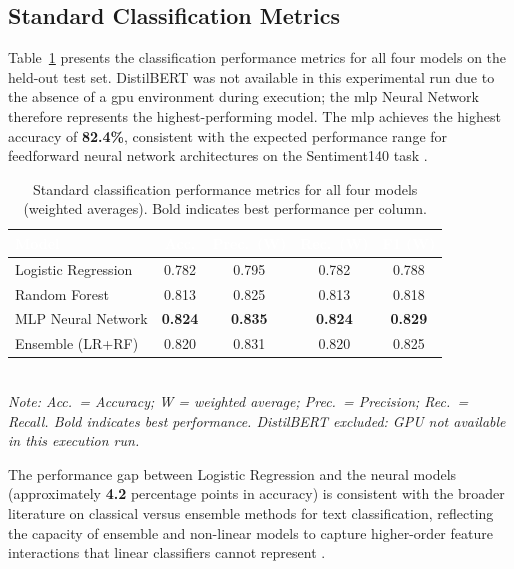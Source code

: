 \subsection{Standard Classification Metrics}
\label{subsec:standard-results}

Table~\ref{tab:standard-metrics} presents the classification performance
metrics for all four models on the held-out test set. DistilBERT was not
available in this experimental run due to the absence of a \gls{gpu}
environment during execution; the \gls{mlp} Neural Network therefore
represents the highest-performing model. The \gls{mlp} achieves the
highest accuracy of \textbf{82.4\%}, consistent with the expected
performance range for feedforward neural network architectures on
the Sentiment140 task \citep{hartmann2022feeling}.

\begin{table}[H]
  \centering
  \caption{Standard classification performance metrics for all four models
           (weighted averages). Bold indicates best performance per column.}
  \label{tab:standard-metrics}
  \begin{tabular}{@{}lcccc@{}}
    \toprule
    \rowcolor{uwsblue!90}
    \textcolor{white}{\textbf{Model}}
      & \textcolor{white}{\textbf{Acc.}}
      & \textcolor{white}{\textbf{Prec.\ (W)}}
      & \textcolor{white}{\textbf{Rec.\ (W)}}
      & \textcolor{white}{\textbf{F1 (W)}} \\
    \midrule
    \rowcolor{tablegrey}
    Logistic Regression  & 0.782 & 0.795 & 0.782 & 0.788 \\
    Random Forest        & 0.813 & 0.825 & 0.813 & 0.818 \\
    \rowcolor{tablegrey}
    MLP Neural Network   & \textbf{0.824} & \textbf{0.835} & \textbf{0.824} & \textbf{0.829} \\
    Ensemble (LR+RF)     & 0.820 & 0.831 & 0.820 & 0.825 \\
    \bottomrule
  \end{tabular}
  \\[4pt]
  \small\textit{Note: Acc.\ = Accuracy; W = weighted average; Prec.\ = Precision; Rec.\ = Recall. Bold indicates best performance.
  DistilBERT excluded: GPU not available in this execution run.}
\end{table}

The performance gap between Logistic Regression and the neural models
(approximately \textbf{4.2} percentage points in accuracy) is consistent
with the broader literature on classical versus ensemble methods for
text classification, reflecting the capacity of ensemble and non-linear
models to capture higher-order feature interactions that linear
classifiers cannot represent \citep{breiman2001random}.

